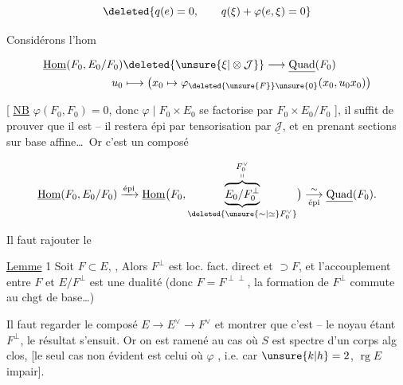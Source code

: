 
\[
 \deleted{q(e)=0,\qquad q(\xi)+\varphi(e,\xi)=0}
\]


Considérons l'hom

\[
 \begin{aligned}
 \underline{\mathrm{Hom}}(F_0,E_0/F_0)&\deleted{\unsure{\xi|\otimes\mathcal J}}\longrightarrow\underline{\mathrm{Quad}}(F_0)\\
 u_0&\longmapsto\bigl(x_0\mapsto\varphi_{\deleted{\unsure{F}}\unsure{0}}(x_0,u_0x_0)\bigr)
 \end{aligned}
\]

[ \uline{NB} $\varphi(F_0,F_0)=0$, donc $\varphi\mid F_0\times E_0$ se factorise par $F_0\times E_0/F_0$ ], il suffit de prouver que il est  -- il restera épi par tensorisation par $\underline{\mathcal J}$, et en prenant sections sur base affine\ldots\ Or c'est un composé

\[
 \underline{\mathrm{Hom}}(F_0,E_0/F_0)\xrightarrow{\text{épi}}
 \underline{\mathrm{Hom}}\bigl(F_0,
 \underbrace{\overbrace{E_0/F_0^\perp}^{\substack{F_0^\vee\\\shortparallel}}}_{\deleted{\unsure{\sim|\simeq}F_0^\vee}}\bigr)
 \underset{\text{épi}}{\overset{\sim}{\longrightarrow}}\underline{\mathrm{Quad}}(F_0).
\]

 



Il faut rajouter le

\uline{Lemme} 1 Soit $F\subset E$, , Alors $F^\perp$ est loc. fact. direct et $\supset F$, et l'accouplement entre $F$ et $E/F^\perp$ est une dualité (donc $F=F^{\perp\perp}$, la formation de $F^\perp$ commute au chgt de base\ldots)

Il faut regarder  le composé $E\longrightarrow E^\vee\longrightarrow F^\vee$ et montrer que c'est  -- le noyau étant $F^\perp$, le résultat s'ensuit. Or on est ramené au cas où $S$ est spectre d'un corps alg clos, [le seul cas non évident est celui où $\varphi$ , i.e. car $\unsure{k|h}=2$, $\operatorname{rg} E$ impair].

